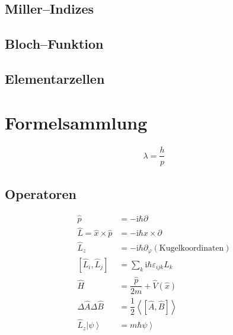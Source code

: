 \documentclass[a4paper,12pt]{article}
\numberwithin{equation}{section}
\begin{document}
\subsection{Miller--Indizes}
\subsection{Bloch--Funktion}
\subsection{Elementarzellen}

\newpage
\section{Formelsammlung}
\begin{align} 
        \lambda =\dfrac{h}{p}
\end{align} 

\subsection{Operatoren}
\begin{align} 
        \hat{p}&=-\text{i}\hbar \partial\\
        \hat{L}=\hat{x}\times \hat{p}&=-\text{i}\hbar x\times \partial\\
        \hat{L}_z&=-\text{i}\hbar \partial_\varphi \left(\text{Kugelkoordinaten}\right)\\
        \left[\hat{L}_i,\hat{L}_j\right]&=\sum_{k}^{}\text{i}\hbar \varepsilon _{ijk}\hat{L}_k\\
        \hat{H}&=\dfrac{\hat{p}}{2m}+\hat{V}\left(\hat{x}\right)\\
        \Delta \hat{A}\Delta \hat{B}&=\dfrac{1}{2}\left\langle \left[\hat{A},\hat{B}\right]\right\rangle \\
        \hat{L}_z\left|\psi \right\rangle &= m\hbar \left.\psi \right\rangle 
\end{align} 





\end{document}

